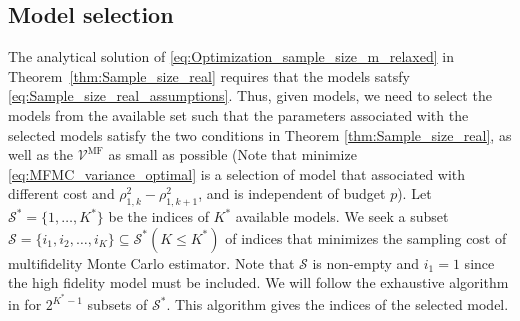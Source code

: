 \subsection{Model selection}
The analytical solution of \eqref{eq:Optimization_sample_size_m_relaxed} in 
Theorem~\ref{thm:Sample_size_real} requires that the models satsfy 
\eqref{eq:Sample_size_real_assumptions}.
Thus, given models, we need to select the models from the available set such that the parameters 
associated with the selected models satisfy the two conditions in Theorem \ref{thm:Sample_size_real}, as well as the $\mathcal{V}^{\text{MF}}$ as small as possible (Note that minimize \eqref{eq:MFMC_variance_optimal} is a selection of model that associated with 
different cost and $\rho_{1,k}^2 - \rho_{1,k+1}^2$, 
and is independent of budget $p$). Let $\mathcal{S}^*=\{1, \ldots, K^*\}$ be the indices of $K^*$ available models. 
We seek a subset $\mathcal{S}=\{i_1,i_2, \ldots,i_{K}\}\subseteq \mathcal{S}^* (K\le K^*)$ of indices that minimizes the sampling cost of multifidelity Monte Carlo estimator. Note that $\mathcal{S}$ is non-empty and $i_1=1$ since the high fidelity model must be included. 
We will follow the exhaustive algorithm in \cite[Algorithm~1]{BPeherstorfer_KWillcox_MDGunzburger_2016a} 
for $2^{K^*-1}$ subsets of $\mathcal{S}^*$.  This algorithm gives the indices of the selected model.

